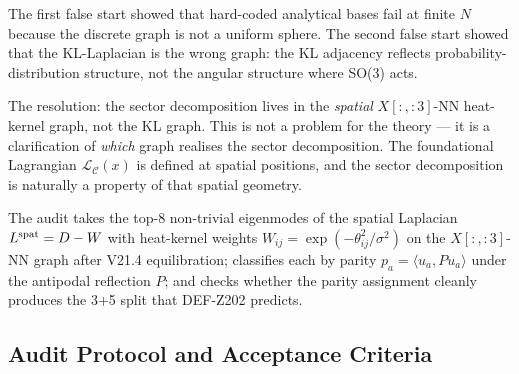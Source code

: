 \documentclass[12pt, a4paper]{article}
\begin{document}
\begin{keybox}[title={Council Resolution: The Spatial Laplacian
  Carries the Sector Structure (FIND-EA01)}]
The first false start showed that hard-coded analytical bases fail
at finite $N$ because the discrete graph is not a uniform sphere.
The second false start showed that the KL-Laplacian is the wrong
graph: the KL adjacency reflects probability-distribution structure,
not the angular structure where SO(3) acts.

The resolution: the sector decomposition lives in the
\emph{spatial} $X[:, :3]$-NN heat-kernel graph, not the KL graph.
This is not a problem for the theory --- it is a clarification of
\emph{which} graph realises the sector decomposition. The
foundational Lagrangian $\mathcal{L}_\mathcal{C}(x)$ is defined at
spatial positions, and the sector decomposition is naturally a
property of that spatial geometry.

The audit takes the top-8 non-trivial eigenmodes of the spatial
Laplacian $L^{\rm spat} = D - W$ with heat-kernel weights
$W_{ij} = \exp(-\theta_{ij}^2 / \sigma^2)$ on the $X[:, :3]$-NN
graph after V21.4 equilibration; classifies each by
parity $p_a = \langle u_a, P u_a \rangle$ under the antipodal
reflection $P$; and checks whether the parity assignment cleanly
produces the 3+5 split that DEF-Z202 predicts.
\end{keybox}

\subsection{Audit Protocol and Acceptance Criteria}
\end{document}
